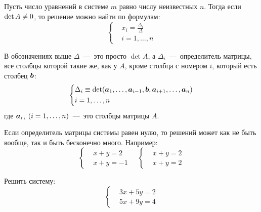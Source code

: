 \documentclass[a4paper,12pt]{article}
\begin{document}
  \begin{theorem}
    Пусть число уравнений в системе $m$ равно числу неизвестных $n$.
    Тогда если $\det A \hm{\not=} 0$, то решение можно найти по формулам:
    \[
      \left\{
        \begin{aligned}
          &x_i = \frac{\Delta_i}{\Delta}\\
          &i = 1, \ldots, n
        \end{aligned}
      \right.
    \]
    
    В обозначениях выше $\Delta$~---~это просто $\det A$, а $\Delta_i$~---~определитель матрицы, все столбцы которой такие же, как у $A$, кроме столбца с номером $i$, который есть столбец $\boldsymbol b$:
    \[
      \left\{
        \begin{aligned}
          &\Delta_i \equiv \det (\boldsymbol a_1, \ldots, \boldsymbol a_{i - 1}, \boldsymbol b, \boldsymbol a_{i + 1}, \ldots, \boldsymbol a_n)\\
          &i = 1, \ldots, n
        \end{aligned}
      \right.
    \]
    где $\boldsymbol a_i$, $(i \hm= 1, \ldots, n)$~---~это столбцы матрицы $A$.
  \end{theorem}
  
  
  \begin{example}
    Если определитель матрицы системы равен нулю, то решений может как не быть вообще, так и быть бесконечно много.
    Например:
    \[
      \left\{
        \begin{aligned}
          &x + y = 2\\
          &x + y = -1
        \end{aligned}
      \right.
      \quad \left\{
        \begin{aligned}
          &x + y = 2\\
          &x + y = 2
        \end{aligned}
      \right.
    \]
  \end{example}
  
  
  \begin{problem}[17.1(2)]
    Решить систему:
    \[
      \left\{
        \begin{aligned}
          &3x + 5y = 2\\
          &5x + 9y = 4
        \end{aligned}
      \right.
    \]
  \end{problem}
  
\end{document}
